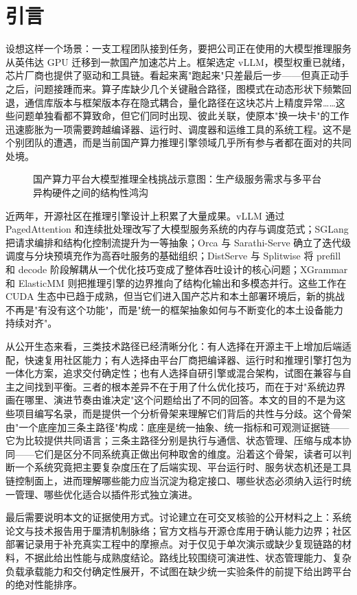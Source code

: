 \section{引言}

设想这样一个场景：一支工程团队接到任务，要把公司正在使用的大模型推理服务从英伟达 GPU 迁移到一款国产加速芯片上。框架选定 vLLM，模型权重已就绪，芯片厂商也提供了驱动和工具链。看起来离"跑起来"只差最后一步——但真正动手之后，问题接踵而来。算子库缺少几个关键融合路径，图模式在动态形状下频繁回退，通信库版本与框架版本存在隐式耦合，量化路径在这块芯片上精度异常……这些问题单独看都不算致命，但它们同时出现、彼此关联，使原本"换一块卡"的工作迅速膨胀为一项需要跨越编译器、运行时、调度器和运维工具的系统工程。这不是个别团队的遭遇，而是当前国产算力推理引擎领域几乎所有参与者都在面对的共同处境。

\begin{figure}[!htb]
\centering
\resizebox{0.92\linewidth}{!}{}
\caption{国产算力平台大模型推理全栈挑战示意图：生产级服务需求与多平台异构硬件之间的结构性鸿沟}
\label{fig:fullstack-challenge}
\end{figure}

近两年，开源社区在推理引擎设计上积累了大量成果。vLLM 通过 PagedAttention 和连续批处理改写了大模型服务系统的内存与调度范式\citep{kwon2023efficient,vllm}；SGLang 把请求编排和结构化控制流提升为一等抽象\citep{sglang,sglangpaper}；Orca 与 Sarathi-Serve 确立了迭代级调度与分块预填充作为高吞吐服务的基础组织\citep{orca2023,sarathi2023}；DistServe 与 Splitwise 将 prefill 和 decode 阶段解耦从一个优化技巧变成了整体吞吐设计的核心问题\citep{zhong2024distserve,splitwise2024}；XGrammar 和 ElasticMM 则把推理引擎的边界推向了结构化输出和多模态并行\citep{dong2024xgrammar,liu2025elasticmm}。这些工作在 CUDA 生态中已趋于成熟，但当它们进入国产芯片和本土部署环境后，新的挑战不再是"有没有这个功能"，而是"统一的框架抽象如何与不断变化的本土设备能力持续对齐"。

从公开生态来看，三类技术路径已经清晰分化：有人选择在开源主干上增加后端适配，快速复用社区能力；有人选择由平台厂商把编译器、运行时和推理引擎打包为一体化方案，追求交付确定性；也有人选择自研引擎或混合架构，试图在兼容与自主之间找到平衡。三者的根本差异不在于用了什么优化技巧，而在于对"系统边界画在哪里、演进节奏由谁决定"这个问题给出了不同的回答。本文的目的不是为这些项目编写名录，而是提供一个分析骨架来理解它们背后的共性与分歧。这个骨架由"一个底座加三条主路径"构成：底座是统一抽象、统一指标和可观测证据链——它为比较提供共同语言；三条主路径分别是执行与通信、状态管理、压缩与成本协同——它们是区分不同系统真正做出何种取舍的维度。沿着这个骨架，读者可以判断一个系统究竟把主要复杂度压在了后端实现、平台运行时、服务状态机还是工具链控制面上，进而理解哪些能力应当沉淀为稳定接口、哪些状态必须纳入运行时统一管理、哪些优化适合以插件形式独立演进。

最后需要说明本文的证据使用方式。讨论建立在可交叉核验的公开材料之上：系统论文与技术报告用于厘清机制脉络；官方文档与开源仓库用于确认能力边界；社区部署记录用于补充真实工程中的摩擦点。对于仅见于单次演示或缺少复现链路的材料，不据此给出性能与成熟度结论。路线比较围绕可演进性、状态管理能力、复杂负载承载能力和交付确定性展开，不试图在缺少统一实验条件的前提下给出跨平台的绝对性能排序。
